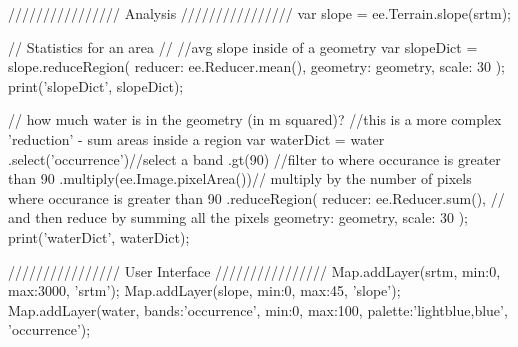 //////////////// Analysis ////////////////
var slope = ee.Terrain.slope(srtm);

// Statistics for an area //
//avg slope inside of a geometry
var slopeDict = slope.reduceRegion({
  reducer: ee.Reducer.mean(),
  geometry: geometry,
  scale: 30
});
print('slopeDict', slopeDict);


// how much water is in the geometry (in m squared)?
//this is a more complex 'reduction' - sum areas inside a region
var waterDict = water
    .select('occurrence')//select a band
    .gt(90) //filter to where occurance is greater than 90%
    .multiply(ee.Image.pixelArea())// multiply by the number of pixels where occurance is greater than 90%
    .reduceRegion({
      reducer: ee.Reducer.sum(),  // and then reduce by summing all the pixels
      geometry: geometry,
      scale: 30
    });
print('waterDict', waterDict);

//////////////// User Interface ////////////////
Map.addLayer(srtm, {min:0, max:3000}, 'srtm');
Map.addLayer(slope, {min:0, max:45}, 'slope');
Map.addLayer(water, {bands:'occurrence', min:0, max:100, palette:'lightblue,blue'}, 'occurrence');

